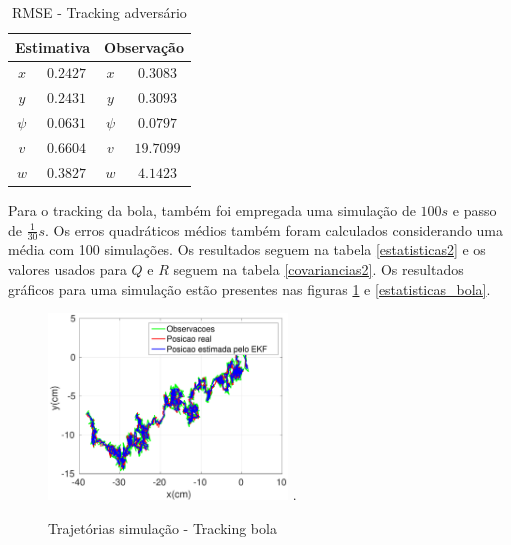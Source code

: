\documentclass[paper=a4, fontsize=11pt]{scrartcl}
\begin{document}
\begin{table}[!t]
\caption{RMSE - Tracking adversário}
\label{estatisticas1}
\centering
\begin{tabular}{|c|c|c|c|} 
\hline
\multicolumn{2}{|c|}{Estimativa} & \multicolumn{2}{|c|}{Observação}\\
\hline
$x$ & $0.2427$ & $x$ & $0.3083$ \\
\hline
$y$ & $0.2431$ & $y$ & $0.3093$ \\
\hline
$\psi$ & $0.0631$ & $\psi$ & $0.0797$ \\
\hline
$v$ & $0.6604$ & $v$ & $19.7099$ \\
\hline
$w$ & $0.3827$ & $w$ & $4.1423$ \\
\hline
\end{tabular}
\end{table}

Para o tracking da bola, também foi empregada uma simulação de $100s$ e passo de $\frac{1}{30}s$. Os erros quadráticos médios também foram calculados considerando uma média com 100 simulações. Os resultados seguem na tabela \ref{estatisticas2} e os valores usados para $Q$ e $R$ seguem na tabela \ref{covariancias2}. Os resultados gráficos para uma simulação estão presentes nas figuras \ref{trajetorias2} e \ref{estatisticas_bola}.

\begin{figure}[!t]
\centering
\includegraphics[width=2.5in]{trajetorias2.pdf}
\DeclareGraphicsExtensions.
\caption{Trajetórias simulação - Tracking bola}
\label{trajetorias2}
\end{figure}
\end{document}
